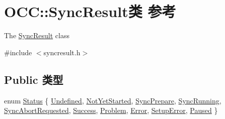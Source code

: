 \hypertarget{class_o_c_c_1_1_sync_result}{}\section{O\+CC\+:\+:Sync\+Result类 参考}
\label{class_o_c_c_1_1_sync_result}


The \hyperlink{class_o_c_c_1_1_sync_result}{Sync\+Result} class  




{\ttfamily \#include $<$syncresult.\+h$>$}

\subsection*{Public 类型}
\begin{DoxyCompactItemize}
\item 
enum \hyperlink{class_o_c_c_1_1_sync_result_a4f4487ea8c462f2ec90c43bce6df1d1e}{Status} \{ \newline
\hyperlink{class_o_c_c_1_1_sync_result_a4f4487ea8c462f2ec90c43bce6df1d1ea17638e60a414514fa062deefe84bad9d}{Undefined}, 
\hyperlink{class_o_c_c_1_1_sync_result_a4f4487ea8c462f2ec90c43bce6df1d1ea219be7a71f8b3e6d7c0ae2b2ede3e580}{Not\+Yet\+Started}, 
\hyperlink{class_o_c_c_1_1_sync_result_a4f4487ea8c462f2ec90c43bce6df1d1eaf4754d5894372cbab99a3f1e1ded22f9}{Sync\+Prepare}, 
\hyperlink{class_o_c_c_1_1_sync_result_a4f4487ea8c462f2ec90c43bce6df1d1ea5b7cb62071ac0fe8cf7fe8a0df896315}{Sync\+Running}, 
\newline
\hyperlink{class_o_c_c_1_1_sync_result_a4f4487ea8c462f2ec90c43bce6df1d1ea3901c58d1bd40a8742ee216bbec62851}{Sync\+Abort\+Requested}, 
\hyperlink{class_o_c_c_1_1_sync_result_a4f4487ea8c462f2ec90c43bce6df1d1ead68646f256b87883bb3bc10986704ba1}{Success}, 
\hyperlink{class_o_c_c_1_1_sync_result_a4f4487ea8c462f2ec90c43bce6df1d1ea2da8e523bf2b326682fd688bad8684ad}{Problem}, 
\hyperlink{class_o_c_c_1_1_sync_result_a4f4487ea8c462f2ec90c43bce6df1d1ea5d79cbd51dfcfeeec98ba60d410d38fb}{Error}, 
\newline
\hyperlink{class_o_c_c_1_1_sync_result_a4f4487ea8c462f2ec90c43bce6df1d1eaa13ef1d07e22fbf1b31079005747e229}{Setup\+Error}, 
\hyperlink{class_o_c_c_1_1_sync_result_a4f4487ea8c462f2ec90c43bce6df1d1eaf35704a5031cef92520ab08260551950}{Paused}
 \}
\end{DoxyCompactItemize}
